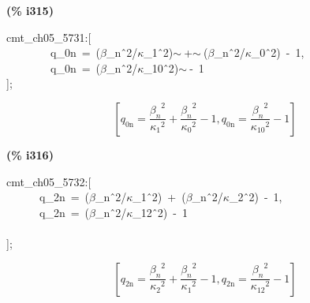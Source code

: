 \documentclass[fleqn]{article}
\begin{document}
\noindent
\begin{minipage}[t]{4.000000em}\color{red}\bfseries
(\% i315)	
\end{minipage}
\begin{minipage}[t]{\textwidth}\color{blue}
cmt\_ch05\_5731:[\\
\ \ \ \ \ \ \ \ q\_0n\ =\ (\ensuremath{\beta}\_n\^\ 2/\ensuremath{\kappa}\_1\^\ 2)\ensuremath{\sim\ }+\ensuremath{\sim\ }(\ensuremath{\beta}\_n\^\ 2/\ensuremath{\kappa}\_0\^\ 2)\ -\ 1,\\
\ \ \ \ \ \ \ \ q\_0n\ =\ (\ensuremath{\beta}\_n\^\ 2/\ensuremath{\kappa}\_10\^\ 2)\ensuremath{\sim\ }-\ 1\\
];
\end{minipage}
\[\displaystyle \tag{\% o315} 
\left[ {q_{\ensuremath{\mathrm{0n}}}}=\frac{{{{{\beta }_n}}^{2}}}{{{{{\kappa }_1}}^{2}}}+\frac{{{{{\beta }_n}}^{2}}}{{{{{\kappa }_0}}^{2}}}-1\operatorname{,}{q_{\ensuremath{\mathrm{0n}}}}=\frac{{{{{\beta }_n}}^{2}}}{{{{{\kappa }_{\ensuremath{\mathrm{10}}}}}^{2}}}-1\right] \mbox{}
\]


\noindent
\begin{minipage}[t]{4.000000em}\color{red}\bfseries
(\% i316)	
\end{minipage}
\begin{minipage}[t]{\textwidth}\color{blue}
cmt\_ch05\_5732:[\\
\ \ \ \ \ \ q\_2n\ =\ (\ensuremath{\beta}\_n\^\ 2/\ensuremath{\kappa}\_1\^\ 2)\ +\ (\ensuremath{\beta}\_n\^\ 2/\ensuremath{\kappa}\_2\^\ 2)\ -\ 1,\\
\ \ \ \ \ \ q\_2n\ =\ (\ensuremath{\beta}\_n\^\ 2/\ensuremath{\kappa}\_12\^\ 2)\ -\ 1\\
\ \ \ \\
];
\end{minipage}
\[\displaystyle \tag{\% o316} 
\left[ {q_{\ensuremath{\mathrm{2n}}}}=\frac{{{{{\beta }_n}}^{2}}}{{{{{\kappa }_2}}^{2}}}+\frac{{{{{\beta }_n}}^{2}}}{{{{{\kappa }_1}}^{2}}}-1\operatorname{,}{q_{\ensuremath{\mathrm{2n}}}}=\frac{{{{{\beta }_n}}^{2}}}{{{{{\kappa }_{\ensuremath{\mathrm{12}}}}}^{2}}}-1\right] \mbox{}
\]
\end{document}
